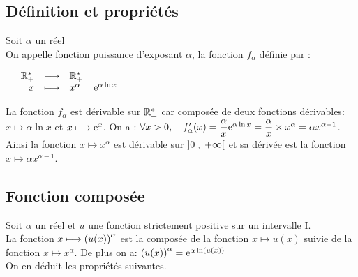 
\everymath{\displaystyle}




\subsection{Définition  et propriétés}

\begin{definition}
Soit $\alpha $ un réel\\
On appelle  fonction puissance d'exposant $\alpha $,  la fonction $ f_{\alpha} $ définie par  :
\begin{center}
 $ \begin{array}{lrcl}
     & \mathbb{R}_+^*  &   \longrightarrow &  \mathbb{R}_+^* \\ 
  &  x & \longmapsto & x^{\alpha}=\mathrm{e}^{\alpha \ln x}  \end{array} $ 
\end{center}
\end{definition}

\begin{property}
La fonction $ f_{\alpha} $  est dérivable sur $ \mathbb{R}_+^* $ car composée de deux fonctions dérivables:  \\ $ x \longmapsto \alpha \ln x $\; et \; $ x\longmapsto \mathrm{e}^{x} $.  On a :\; $ \forall  x >0,\quad f_{\alpha}^{\prime} (x) =\dfrac{\alpha}{x} \mathrm{e}^{\alpha \ln x} =\dfrac{\alpha}{x}\times x^{\alpha}  =\alpha x^{\alpha-1}$.\\  Ainsi  la fonction \;$ x \longmapsto  x^{\alpha}  $\; est dérivable sur \;$ \left]0 \;,\; +\infty\right[ $\;   et sa dérivée est la fonction\; $ x\longmapsto \alpha x^{\alpha -1} $. 

\end{property}

 \subsection{Fonction composée}

Soit $\alpha $ un réel  et $u$  une fonction strictement positive sur un intervalle I. \\
La fonction \; $ x\longmapsto \left(u(x)\right)^{\alpha} $\; est la composée de la fonction $ x\longmapsto u(x) $  suivie de la fonction  \; $ x \longmapsto  x^{\alpha} $. De plus on a:\; $ \left(u(x)\right)^{\alpha}=\mathrm{e}^{\alpha\ln (u(x))} $\\
On en déduit les propriétés suivantes.


